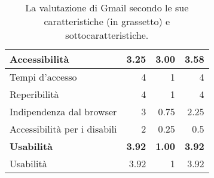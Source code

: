 \begin{table}[h!]
\begin{tabular}{|l|r|r|r|}
				\textbf{Accessibilità} & \textbf{3.25} & \textbf{3.00} & \textbf{3.58}\\ \hline
				Tempi d'accesso & 4 & 1 & 4\\ \hline
				Reperibilità & 4 & 1 & 4\\ \hline
				Indipendenza dal browser & 3 & 0.75 & 2.25\\ \hline
				Accessibilità per i disabili & 2 & 0.25 & 0.5\\ \hline
				\textbf{Usabilità} & \textbf{3.92} & \textbf{1.00} & \textbf{3.92}\\ \hline
				Usabilità & 3.92 & 1 & 3.92\\ \hline
			\end{tabular}
			\caption[Valutazione di Gmail]{La valutazione di Gmail secondo le sue caratteristiche (in grassetto) e sottocaratteristiche.}
			\label{tab:valutazione_gmail}
		\end{table}
